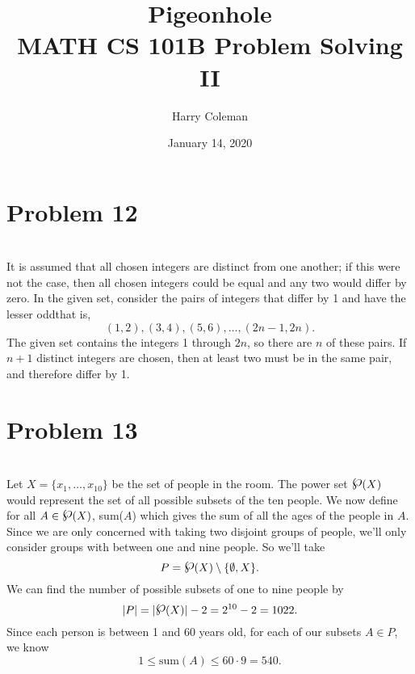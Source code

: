 \documentclass[12pt]{article}
\newcommand{\powerset}{\raisebox{.15\baselineskip}{\Large\ensuremath{\wp}}}
\begin{document}
 
\title{Pigeonhole\\
    \large MATH CS 101B Problem Solving II}
\author{Harry Coleman}
\date{January 14, 2020}

\maketitle

\section*{Problem 12}
\\

It is assumed that all chosen integers are distinct from one another; if this were not the case, then all chosen integers could be equal and any two would differ by zero. In the given set, consider the pairs of integers that differ by 1 and have the lesser odd\textemdash that is, 
\[(1,2),(3,4),(5,6),\dots,(2n-1,2n).\]
The given set contains the integers 1 through $2n$, so there are $n$ of these pairs. If $n+1$ distinct integers are chosen, then at least two must be in the same pair, and therefore differ by 1.


\newpage
\section*{Problem 13}
\\

Let $X=\{x_1, \dots, x_{10}\}$ be the set of people in the room. The power set $\powerset(X)$ would represent the set of all possible subsets of the ten people. We now define for all $A\in\powerset(X)$, sum($A$) which gives the sum of all the ages of the people in $A$. Since we are only concerned with taking two disjoint groups of people, we'll only consider groups with between one and nine people. So we'll take
\[P = \powerset(X)\setminus\{\emptyset, X\}.\]
We can find the number of possible subsets of one to nine people by
\[|P| = |\powerset(X)|-2=2^{10}-2=1022.\]
Since each person is between 1 and 60 years old, for each of our subsets $A\in P$, we know 
\[1\leq\text{sum}(A)\leq60\cdot9=540.\]
\end{document}
